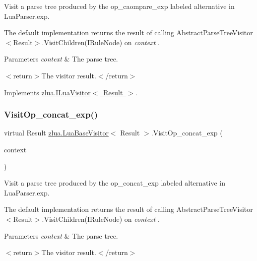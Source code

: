 Visit a parse tree produced by the {\ttfamily op\+\_\+caompare\+\_\+exp} labeled alternative in Lua\+Parser.\+exp. 

The default implementation returns the result of calling Abstract\+Parse\+Tree\+Visitor$<$\+Result$>$.\+Visit\+Children(\+I\+Rule\+Node) on {\itshape context} . 


\begin{DoxyParams}{Parameters}
{\em context} & The parse tree.\\
\hline
\end{DoxyParams}
$<$return$>$The visitor result.$<$/return$>$ 

Implements \mbox{\hyperlink{interfacezlua_1_1_i_lua_visitor_ae6cb562355272f719cb822a673909baa}{zlua.\+I\+Lua\+Visitor$<$ Result $>$}}.

\mbox{\label{classzlua_1_1_lua_base_visitor_a122ef407ec779e8922c617dc3a095356}} 
\subsubsection{\texorpdfstring{Visit\+Op\+\_\+concat\+\_\+exp()}{VisitOp\_concat\_exp()}}
{\footnotesize\ttfamily virtual Result \mbox{\hyperlink{classzlua_1_1_lua_base_visitor}{zlua.\+Lua\+Base\+Visitor}}$<$ Result $>$.Visit\+Op\+\_\+concat\+\_\+exp (\begin{DoxyParamCaption}\item[{\mbox{[}\+Not\+Null\mbox{]} \mbox{\hyperlink{classzlua_1_1_lua_parser_1_1_op__concat__exp_context}{Lua\+Parser.\+Op\+\_\+concat\+\_\+exp\+Context}}}]{context }\end{DoxyParamCaption})\hspace{0.3cm}{\ttfamily [virtual]}}



Visit a parse tree produced by the {\ttfamily op\+\_\+concat\+\_\+exp} labeled alternative in Lua\+Parser.\+exp. 

The default implementation returns the result of calling Abstract\+Parse\+Tree\+Visitor$<$\+Result$>$.\+Visit\+Children(\+I\+Rule\+Node) on {\itshape context} . 


\begin{DoxyParams}{Parameters}
{\em context} & The parse tree.\\
\hline
\end{DoxyParams}
$<$return$>$The visitor result.$<$/return$>$ 

